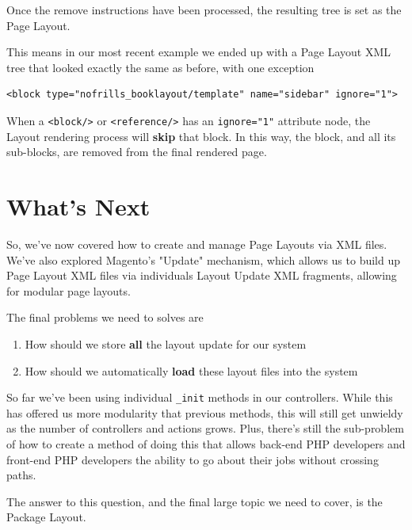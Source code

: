 \documentclass[oneside]{book}
\begin{document}
Once the remove instructions have been processed, the resulting tree is set as the Page Layout.

This means in our most recent example we ended up with a Page Layout XML tree that looked exactly the same as before, with one exception

\begin{lstlisting}
<block type="nofrills_booklayout/template" name="sidebar" ignore="1">

\end{lstlisting}


When a \footnotesize\texttt{\textless block/\textgreater } \normalsize  or \footnotesize\texttt{\textless reference/\textgreater } \normalsize  has an \footnotesize\texttt{ignore="1"} \normalsize  attribute node, the Layout rendering process will \textbf{skip} that block.  In this way, the block, and all its sub-blocks, are removed from the final rendered page.      

\section{What's Next}

So, we've now covered how to create and manage Page Layouts via XML files.  We've also explored Magento's "Update" mechanism, which allows us to build up Page Layout XML files via individuals Layout Update XML fragments, allowing for modular page layouts.

The final problems we need to solves are 

\begin{enumerate}
\item How should we store \textbf{all} the layout update for our system
\item How should we automatically \textbf{load} these layout files into the system
\end{enumerate}


So far we've been using individual \footnotesize\texttt{\_init} \normalsize  methods in our controllers.  While this has offered us more modularity that previous methods, this will still get unwieldy as the number of controllers and actions grows.  Plus, there's still the sub-problem of how to create a method of doing this that allows back-end PHP developers and front-end PHP developers the ability to go about their jobs without crossing paths.  

The answer to this question, and the final large topic we need to cover, is the Package Layout.  
\end{document}
